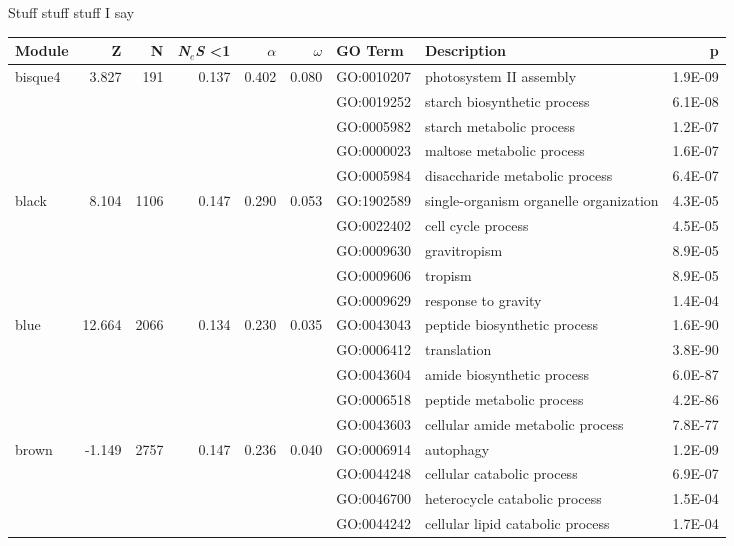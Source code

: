 \documentclass{ut-thesis}
\begin{document}
Stuff stuff stuff I say

\begin{landscape}

\begin{table}[ht]
\centering
\begin{tabular}{|l|rrrrrlP{5cm}r|}
  \hline
Module & Z & N & \textit{N$_{e}$S} \textless 1 & $\alpha$ & $\omega$ & GO Term & Description & p \\ 
  \hline
bisque4 & 3.827 & 191 & 0.137 & 0.402 & 0.080 & GO:0010207 & photosystem II assembly & 1.9E-09 \\ 
   &  &  &  &  &  & GO:0019252 & starch biosynthetic process & 6.1E-08 \\ 
   &  &  &  &  &  & GO:0005982 & starch metabolic process & 1.2E-07 \\ 
   &  &  &  &  &  & GO:0000023 & maltose metabolic process & 1.6E-07 \\ 
   &  &  &  &  &  & GO:0005984 & disaccharide metabolic process & 6.4E-07 \\ 
\hline
  black & 8.104 & 1106 & 0.147 & 0.290 & 0.053 & GO:1902589 & single-organism organelle organization & 4.3E-05 \\ 
   &  &  &  &  &  & GO:0022402 & cell cycle process & 4.5E-05 \\ 
   &  &  &  &  &  & GO:0009630 & gravitropism & 8.9E-05 \\ 
   &  &  &  &  &  & GO:0009606 & tropism & 8.9E-05 \\ 
   &  &  &  &  &  & GO:0009629 & response to gravity & 1.4E-04 \\ 
\hline  
blue & 12.664 & 2066 & 0.134 & 0.230 & 0.035 & GO:0043043 & peptide biosynthetic process & 1.6E-90 \\ 
   &  &  &  &  &  & GO:0006412 & translation & 3.8E-90 \\ 
   &  &  &  &  &  & GO:0043604 & amide biosynthetic process & 6.0E-87 \\ 
   &  &  &  &  &  & GO:0006518 & peptide metabolic process & 4.2E-86 \\ 
   &  &  &  &  &  & GO:0043603 & cellular amide metabolic process & 7.8E-77 \\ 
\hline  
brown & -1.149 & 2757 & 0.147 & 0.236 & 0.040 & GO:0006914 & autophagy & 1.2E-09 \\ 
   &  &  &  &  &  & GO:0044248 & cellular catabolic process & 6.9E-07 \\ 
   &  &  &  &  &  & GO:0046700 & heterocycle catabolic process & 1.5E-04 \\ 
   &  &  &  &  &  & GO:0044242 & cellular lipid catabolic process & 1.7E-04 \\ 

\end{tabular}
\end{table}
\end{landscape}
\end{document}
